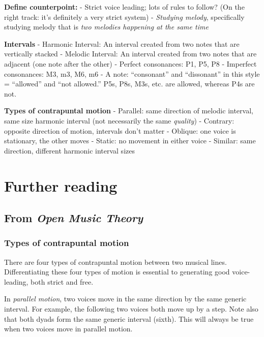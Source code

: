 \documentclass{book}
\begin{document}
\textbf{Define counterpoint:} - Strict voice leading; lots of rules to follow?
(On the right track: it's definitely a very strict system) - \emph{Studying
melody}, specifically studying melody that is \emph{two melodies happening at
the same time}

\textbf{Intervals} - Harmonic Interval: An interval created from two notes
that are vertically stacked - Melodic Interval: An interval created from two
notes that are adjacent (one note after the other) - Perfect consonances: P1,
P5, P8 - Imperfect consonances: M3, m3, M6, m6 - A note: ``consonant'' and
``dissonant'' in this style = ``allowed'' and ``not allowed.'' P5s, P8s, M3s,
etc. are allowed, whereas P4s are not.

\textbf{Types of contrapuntal motion} - Parallel: same direction of melodic
interval, same size harmonic interval (not necessarily the same
\emph{quality}) - Contrary: opposite direction of motion, intervals don't
matter - Oblique: one voice is stationary, the other moves - Static: no
movement in either voice - Similar: same direction, different harmonic
interval sizes

\hypertarget{further-reading-2}{%
\chapter{Further reading}\label{further-reading-2}}

\hypertarget{from-open-music-theory-3}{%
\section{\texorpdfstring{From \emph{Open Music
Theory}}{From Open Music Theory}}\label{from-open-music-theory-3}}

\hypertarget{types-of-contrapuntal-motion}{%
\subsection{Types of contrapuntal motion}\label{types-of-contrapuntal-motion}}

There are four types of contrapuntal motion between two musical lines.
Differentiating these four types of motion is essential to generating good
voice-leading, both strict and free.

In \emph{parallel motion}, two voices move in the same direction by the same
generic interval. For example, the following two voices both move up by a
step. Note also that both dyads form the same generic interval (sixth). This
will always be true when two voices move in parallel motion.
\end{document}
